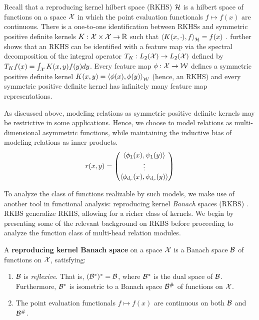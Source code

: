 Recall that a reproducing kernel hilbert space (RKHS) ${\mathcal{H}}$ is a hilbert space of functions on a space ${\mathcal{X}}$ in which the point evaluation functionals $f \mapsto f(x)$ are continuous. There is a one-to-one identification between RKHSs and symmetric positive definite kernels $K: {\mathcal{X}} \times {\mathcal{X}} \to \mathbb{R}$ such that $\left \langle K(x, \cdot), f \right\rangle_{\mathcal{H}} = f(x)$ \parencite{moore-aronszajn}. \parencite{mercerFunctionsPositive1909} further shows that an RKHS can be identified with a feature map via the spectral decomposition of the integral operator $T_K: L_2({\mathcal{X}}) \to L_2({\mathcal{X}})$ defined by $T_K f(x) = \int_{\mathcal{X}} K(x, y) f(y) dy$. Every feature map $\phi: {\mathcal{X}} \to {\mathcal{W}}$ defines a symmetric positive definite kernel $K(x, y) = \left \langle \phi(x), \phi(y) \right\rangle_{\mathcal{W}}$ (hence, an RKHS) and every symmetric positive definite kernel has infinitely many feature map representations.

As discussed above, modeling relations as symmetric positive definite kernels may be restrictive in some applications. Hence, we choose to model relations as multi-dimensional asymmetric functions, while maintaining the inductive bias of modeling relations as inner products.
\begin{equation*}
    r(x,y) = \begin{pmatrix} \left \langle \phi_1(x), \psi_1(y) \right\rangle \\ \vdots \\ \left \langle \phi_{d_r}(x), \psi_{d_r}(y) \right\rangle\end{pmatrix}
\end{equation*}

To analyze the class of functions realizable by such models, we make use of another tool in functional analysis: reproducing kernel \textit{Banach} spaces (RKBS) \parencite{zhangReproducingKernel2009}. RKBS generalize RKHS, allowing for a richer class of kernels. We begin by presenting some of the relevant background on RKBS before proceeding to analyze the function class of multi-head relation modules.

\begin{definition}
    A \textbf{reproducing kernel Banach space} on a space ${\mathcal{X}}$ is a Banach space ${\mathcal{B}}$ of functions on ${\mathcal{X}}$, satisfying:
    \begin{enumerate}
        \item ${\mathcal{B}}$ is \textit{reflexive}. That is, $({\mathcal{B}}^*)^* = {\mathcal{B}}$, where ${\mathcal{B}}^*$ is the dual space of ${\mathcal{B}}$. Furthermore, ${\mathcal{B}}^*$ is isometric to a Banach space ${\mathcal{B}}^\#$ of functions on ${\mathcal{X}}$.
        \item The point evaluation functionals $f \mapsto f(x)$ are continuous on both ${\mathcal{B}}$ and ${\mathcal{B}}^\#$.
    \end{enumerate}
\end{definition}

